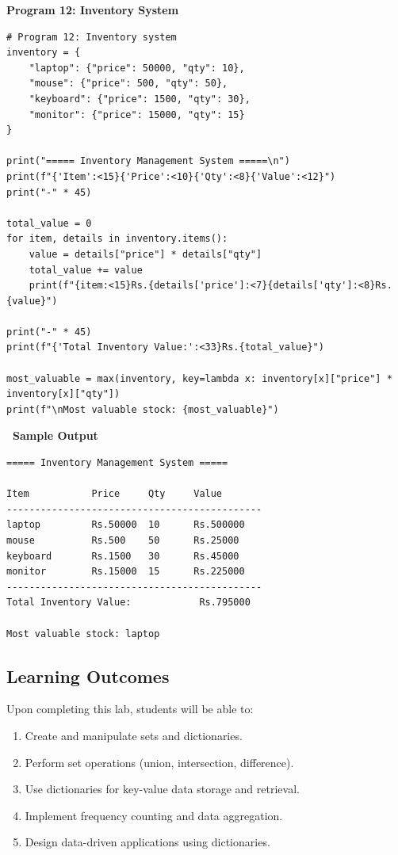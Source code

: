 \documentclass[12pt,a4paper]{article}
\newcommand{\outhead}{\noindent\colorbox{cmrgreen!25}%
  {\textbf{\small\color{cmrdark}~Sample Output~}}\par\vspace{-1pt}}
\begin{document}
\vspace{0.5cm}

\textbf{Program 12: Inventory System}

\begin{lstlisting}
# Program 12: Inventory system
inventory = {
    "laptop": {"price": 50000, "qty": 10},
    "mouse": {"price": 500, "qty": 50},
    "keyboard": {"price": 1500, "qty": 30},
    "monitor": {"price": 15000, "qty": 15}
}

print("===== Inventory Management System =====\n")
print(f"{'Item':<15}{'Price':<10}{'Qty':<8}{'Value':<12}")
print("-" * 45)

total_value = 0
for item, details in inventory.items():
    value = details["price"] * details["qty"]
    total_value += value
    print(f"{item:<15}Rs.{details['price']:<7}{details['qty']:<8}Rs.{value}")

print("-" * 45)
print(f"{'Total Inventory Value:':<33}Rs.{total_value}")

most_valuable = max(inventory, key=lambda x: inventory[x]["price"] * inventory[x]["qty"])
print(f"\nMost valuable stock: {most_valuable}")
\end{lstlisting}

\outhead
\begin{lstlisting}[style=outputstyle]
===== Inventory Management System =====

Item           Price     Qty     Value
---------------------------------------------
laptop         Rs.50000  10      Rs.500000
mouse          Rs.500    50      Rs.25000
keyboard       Rs.1500   30      Rs.45000
monitor        Rs.15000  15      Rs.225000
---------------------------------------------
Total Inventory Value:            Rs.795000

Most valuable stock: laptop
\end{lstlisting}

\subsection{Learning Outcomes}
Upon completing this lab, students will be able to:
\begin{enumerate}
  \item Create and manipulate sets and dictionaries.
  \item Perform set operations (union, intersection, difference).
  \item Use dictionaries for key-value data storage and retrieval.
  \item Implement frequency counting and data aggregation.
  \item Design data-driven applications using dictionaries.
\end{enumerate}
\end{document}
